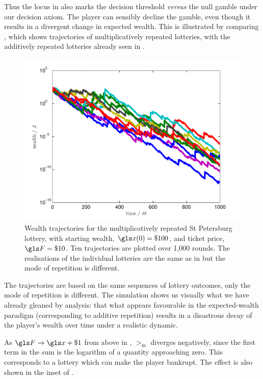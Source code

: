 Thus the locus in  also marks the decision threshold \textit{versus} 
the null gamble under our decision axiom. The player can sensibly decline the 
gamble, even though it results in a divergent change in expected wealth. This 
is illustrated by comparing , which shows trajectories of 
multiplicatively repeated lotteries, with the additively repeated lotteries already 
seen in .
\begin{figure}
\centering
\includegraphics[width=\textwidth]{./chapter_2/figs/lottery_mult_traj.pdf}
\caption{Wealth trajectories for the multiplicatively repeated St Petersburg lottery, 
with starting wealth, $\x(0)=\$100$, and ticket price, $\F=\$10$. Ten 
trajectories are plotted over 1,000 rounds. The realisations of the individual 
lotteries are the same as in  but the mode of repetition is 
different.}
\end{figure}
The trajectories are based on the same sequences of lottery outcomes, only 
the mode of repetition is different. The simulation shows us visually what we 
have already gleaned by analysis: that what appears favourable in the 
expected-wealth paradigm (corresponding to additive repetition) results in a 
disastrous decay of the player's wealth over time under a realistic dynamic.

As $\F\to \x+\$1$ from above in , $\gt_\text{m}$ diverges 
negatively, since the first term in the sum is the logarithm of a quantity approaching 
zero. This corresponds to a lottery which can make the player bankrupt. The effect 
is also shown in the inset of .

